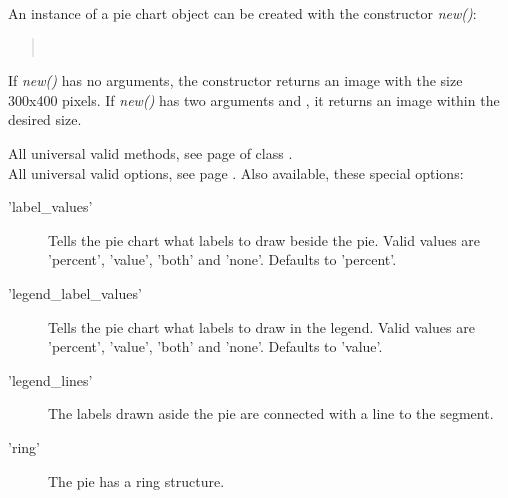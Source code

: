 \begin{Constructor} 
An instance of a pie chart object can be created with the constructor \textit{new()}:
\begin{quote}
\\
\end{quote}

If \textit{new()} has no arguments, 
the constructor returns an image with the size 300x400 pixels. 
If \textit{new()} has two arguments  and , 
it returns an image within the desired size.
\end{Constructor}

\Methods
All universal valid methods, see page \pageref{methods} of class .\\[\parabstand]
%
\Attributes
All universal valid options, see page \pageref{options}. 
Also available, these special options:
\begin{description}
\item['label\_values'] 
          Tells the pie chart what labels to draw beside the pie. 
          Valid values are 'percent', 'value', 'both' and 'none'. Defaults to 'percent'.

\item['legend\_label\_values'] 
          Tells the pie chart what labels to draw in the legend. 
          Valid values are 'percent', 'value', 'both' and 'none'. Defaults to 'value'.
          
\item['legend\_lines']
          The labels drawn aside the pie are connected with a line to the segment.
          
\item['ring']
          The pie has a ring structure.          

\end{description}
